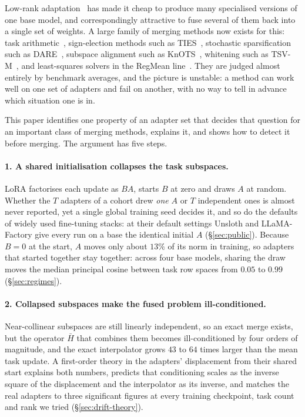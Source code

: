 Low-rank adaptation~\citep{hu2022lora} has made it cheap to produce many
specialised versions of one base model, and correspondingly attractive to fuse
several of them back into a single set of weights. A large family of merging
methods now exists for this: task arithmetic~\citep{ilharco2023task},
sign-election methods such as TIES~\citep{yadav2023ties}, stochastic
sparsification such as DARE~\citep{yu2024dare}, subspace alignment such as
KnOTS~\citep{stoica2025knots}, whitening such as TSV-M~\citep{gargiulo2025tsv},
and least-squares solvers in the RegMean line~\citep{jin2023regmean,tam2024mats}.
They are judged almost entirely by benchmark averages, and the picture is
unstable: a method can work well on one set of adapters and fail on another,
with no way to tell in advance which situation one is in.

This paper identifies one property of an adapter set that decides that
question for an important class of merging methods, explains it, and shows how
to detect it before merging. The argument has five steps.

\paragraph{1. A shared initialisation collapses the task subspaces.} LoRA
factorises each update as $BA$, starts $B$ at zero and draws $A$ at random.
Whether the $T$ adapters of a cohort drew \emph{one} $A$ or $T$ independent
ones is almost never reported, yet a single global training seed decides it,
and so do the defaults of widely used fine-tuning stacks: at their default
settings Unsloth and LLaMA-Factory give every run on a base the identical
initial $A$ (\S\ref{sec:public}). Because $B = 0$ at the start, $A$ moves only
about $13\%$ of its norm in training, so adapters that started together stay
together: across four base models, sharing the draw moves the median principal
cosine between task row spaces from $0.05$ to $0.99$ (\S\ref{sec:regimes}).

\paragraph{2. Collapsed subspaces make the fused problem ill-conditioned.}
Near-collinear subspaces are still linearly independent, so an exact merge
exists, but the operator $\bar H$ that combines them becomes ill-conditioned
by four orders of magnitude, and the exact interpolator grows $43$ to $64$
times larger than the mean task update. A first-order theory in the adapters'
displacement from their shared start explains both numbers, predicts that
conditioning scales as the inverse square of the displacement and the
interpolator as its inverse, and matches the real adapters to three
significant figures at every training checkpoint, task count and rank we tried
(\S\ref{sec:drift-theory}).

